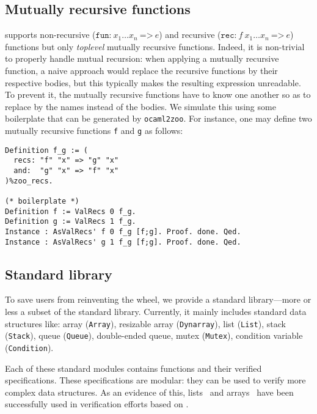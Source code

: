 \subsection{Mutually recursive functions}

\Zoo supports non-recursive ($\texttt{fun:}\ x_1 \dots x_n\ \texttt{=>}\ e$) and recursive ($\texttt{rec:}\ f\ x_1 \dots x_n\ \texttt{=>}\ e$) functions but only \emph{toplevel} mutually recursive functions.
Indeed, it is non-trivial to properly handle mutual recursion: when applying a mutually recursive function, a naive approach would replace the recursive functions by their respective bodies, but this typically makes the resulting expression unreadable.
To prevent it, the mutually recursive functions have to know one another so as to replace by the names instead of the bodies.
We simulate this using some boilerplate that can be generated by \texttt{ocaml2zoo}.
For instance, one may define two mutually recursive functions \texttt{f} and \texttt{g} as follows:

\begin{verbatim}
Definition f_g := (
  recs: "f" "x" => "g" "x"
  and:  "g" "x" => "f" "x"
)%zoo_recs.

(* boilerplate *)
Definition f := ValRecs 0 f_g.
Definition g := ValRecs 1 f_g.
Instance : AsValRecs' f 0 f_g [f;g]. Proof. done. Qed.
Instance : AsValRecs' g 1 f_g [f;g]. Proof. done. Qed.
\end{verbatim}

\subsection{Standard library}

To save users from reinventing the wheel, we provide a standard library---more or less a subset of the \OCaml standard library.
Currently, it mainly includes standard data structures like: array (\texttt{Array}), resizable array (\texttt{Dynarray}), list (\texttt{List}), stack (\texttt{Stack}), queue (\texttt{Queue}), double-ended queue, mutex (\texttt{Mutex}), condition variable (\texttt{Condition}).

Each of these standard modules contains \ZooLang functions and their verified specifications.
These specifications are modular: they can be used to verify more complex data structures.
As an evidence of this, lists~\cite{DBLP:journals/pacmpl/AllainC0S24} and arrays~\cite{allain:hal-04681703} have been successfully used in verification efforts based on \Zoo.

